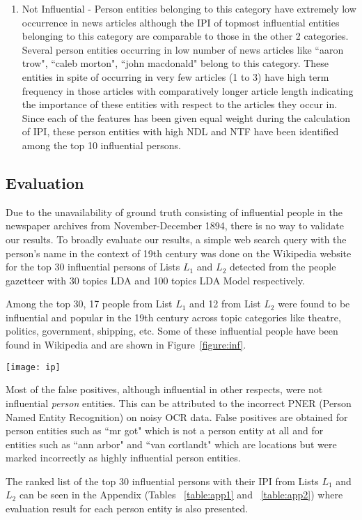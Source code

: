 \begin{enumerate}
\item
Not Influential - Person entities belonging to this category have extremely low occurrence in news articles although the IPI of topmost influential entities belonging to this category are comparable to those in the other 2 categories.
Several person entities occurring in low number of news articles like ``aaron trow", ``caleb morton", ``john macdonald"  belong to this category. These entities in spite of occurring in very few articles (1 to 3) have high term frequency in those articles with comparatively longer article length indicating the importance of these entities with respect to the articles they occur in. Since each of the features has been given equal weight during the calculation of IPI,  these person entities with high NDL and NTF have been identified among the top 10 influential persons. 
 

\end{enumerate} 


\subsection{Evaluation}

Due to the unavailability of ground truth consisting of influential people in the newspaper archives from November-December 1894, there is no way to validate our results. 
To broadly evaluate our results, a simple web search query with the person's name in the context of 19th century was done on the Wikipedia website for the top 30 influential persons of Lists $L_1$ and $L_2$ detected from the people gazetteer with 30 topics LDA and 100 topics LDA Model respectively.

Among the top 30, 17 people from List $L_1$ and 12 from List $L_2$ were found to be influential and popular in the 19th century across topic categories like theatre, politics, government, shipping, etc. Some of these influential people have been found in Wikipedia and are shown in Figure~\ref{figure:inf}. 

\begin{figure*}
\begin{center}
\texttt{[image: ip]}
\caption{Some of the top 30 influential persons obtained from the dataset and also found on Wikipedia during evaluation}
\label{figure:inf}
\end{center}
\end{figure*}


 Most of the false positives, although influential in other respects, were not  influential \emph{person} entities. This can be attributed to the incorrect PNER (Person Named Entity Recognition) on noisy OCR data.
 False positives are obtained for person entities  such as ``mr got" which is not a person entity at all and for entities such as ``ann arbor" and ``van cortlandt" which are  locations but were marked incorrectly as highly influential person entities.
 
 The ranked list of the top 30 influential persons with their IPI from Lists $L_1$ and $L_2$ can be seen in the Appendix (Tables ~\ref{table:app1} and ~\ref{table:app2}) where evaluation result for each person entity is also presented.
